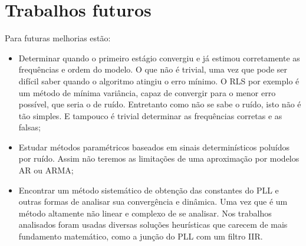\section{Trabalhos futuros}

Para futuras melhorias estão:
\begin{itemize}
	\item Determinar quando o primeiro estágio convergiu e já estimou corretamente as frequências e ordem do modelo. O que não é trivial, uma vez que pode ser difícil saber quando o algoritmo atingiu o erro mínimo. O RLS por exemplo é um método de mínima variância, capaz de convergir para o menor erro possível, que seria o de ruído. Entretanto como não se sabe o ruído, isto não é tão simples. E tampouco é trivial determinar as frequências corretas e as falsas;
	\item Estudar métodos paramétricos baseados em sinais determinísticos poluídos por ruído. Assim não teremos as limitações de uma aproximação por modelos AR ou ARMA; 
	\item Encontrar um método sistemático de obtenção das constantes do PLL e outras formas de analisar sua convergência e dinâmica. Uma vez que é um método altamente não linear e complexo de se analisar. Nos trabalhos analisados foram usadas diversas soluções heurísticas que carecem de mais fundamento matemático, como a junção do PLL com um filtro IIR.
\end{itemize}